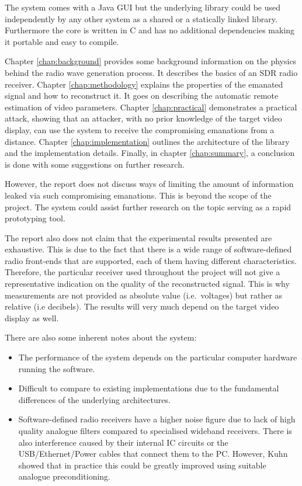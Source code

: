 \documentclass[a4paper,12pt,twoside,openright]{report}
\begin{document}
The system comes with a Java GUI but the underlying library could be used independently by any other system as a shared or a statically linked library. Furthermore the core is written in C and has no additional dependencies making it portable and easy to compile.

Chapter \ref{chap:background} provides some background information on the physics behind the radio wave generation process. It describes the basics of an SDR radio receiver. Chapter \ref{chap:methodology} explains the properties of the emanated signal and how to reconstruct it. It goes on describing the automatic remote estimation of video parameters. Chapter \ref{chap:practical} demonstrates a practical attack, showing that an attacker, with no prior knowledge of the target video display, can use the system to receive the compromising emanations from a distance. Chapter \ref{chap:implementation} outlines the architecture of the library and the implementation details. Finally, in chapter \ref{chap:summary}, a conclusion is done with some suggestions on further research.

However, the report does not discuss ways of limiting the amount of information leaked via such compromising emanations. This is beyond the scope of the project. The system could assist further research on the topic serving as a rapid prototyping tool.

The report also does not claim that the experimental results presented are exhaustive. This is due to the fact that there is a wide range of software-defined radio front-ends that are supported, each of them having different characteristics. Therefore, the particular receiver used throughout the project will not give a representative indication on the quality of the reconstructed signal. This is why measurements are not provided as absolute value (i.e.\  voltages) but rather as relative (i.e decibels). The results will very much depend on the target video display as well.

There are also some inherent notes about the system:
\begin{itemize}

  \item The performance of the system depends on the particular computer hardware running the software. 
  \item Difficult to compare to existing implementations due to the fundamental differences of the underlying architectures.
  \item Software-defined radio receivers have a higher noise figure due to lack of high quality analogue filters compared to specialised wideband receivers. There is also interference caused by their internal IC circuits or the USB/Ethernet/Power cables that connect them to the PC. However, Kuhn showed that in practice this could be greatly improved using suitable analogue preconditioning.
  
\end{itemize}
\end{document}
